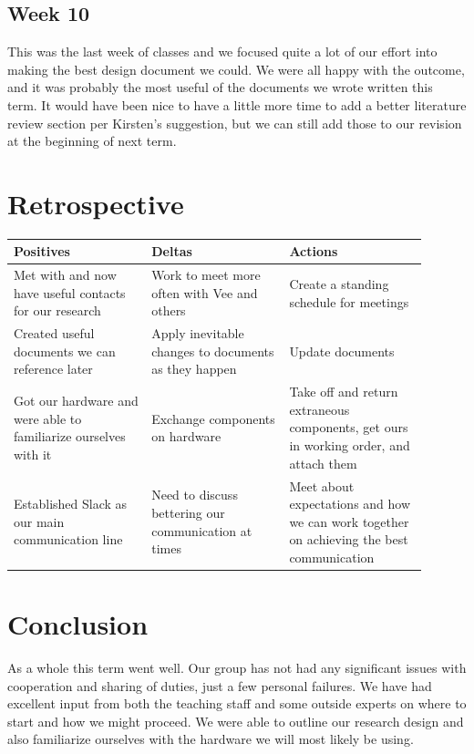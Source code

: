 \documentclass[IEEEtran,letterpaper,10pt,notitlepage,draftclsnofoot,onecolumn]{article}
\begin{document}
\subsection{Week 10}
This was the last week of classes and we focused quite a lot of our effort into making the best design document we could. 
We were all happy with the outcome, and it was probably the most useful of the documents we wrote written this term. 
It would have been nice to have a little more time to add a better literature review section per Kirsten's suggestion, but we can still add those to our revision at the beginning of next term.

\section{Retrospective}

\begin{center}
\begin{tabular}{ |p{0.3\linewidth}|p{0.3\linewidth}|p{0.3\linewidth}| } 
 \hline
 \centering Positives &
 \centering Deltas &   
 \centering Actions \tabularnewline
 \hline
 Met with and now have useful contacts for our research & 
 Work to meet more often with Vee and others &
 Create a standing schedule for meetings \tabularnewline
 \hline 
 Created useful documents we can reference later & 
 Apply inevitable changes to documents as they happen & 
 Update documents \tabularnewline 
 \hline
 Got our hardware and were able to familiarize ourselves with it &
 Exchange components on hardware & 
 Take off and return extraneous components, get ours in working order, and attach them \tabularnewline 
 \hline
 Established Slack as our main communication line &
 Need to discuss bettering our communication at times &
 Meet about expectations and how we can work together on achieving the best communication \tabularnewline
 \hline
\end{tabular}
\end{center}


\section{Conclusion}
As a whole this term went well. 
Our group has not had any significant issues with cooperation and sharing of duties, just a few personal failures.
We have had excellent input from both the teaching staff and some outside experts on where to start and how we might proceed.
We were able to outline our research design and also familiarize ourselves with the hardware we will most likely be using.
\end{document}
